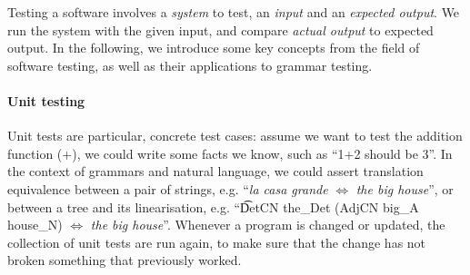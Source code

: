 


Testing a software involves a \emph{system} to test, an \emph{input}
and an \emph{expected output}. We run the system with the given
input, and compare \emph{actual output} to expected output.
In the following, we introduce some key concepts from the field of
software testing, as well as their applications to grammar testing.

\paragraph{Unit testing}

Unit tests are particular, concrete test cases: assume we want to test the
addition function (+), we could write some facts we know, such as
``1+2 should be 3''. In the context of grammars and natural language,
we could assert translation equivalence between a pair of strings,
e.g. ``\emph{la casa grande} $\Leftrightarrow$ \emph{the big house}'',
or between a tree and its linearisation, e.g. ``\t{DetCN the\_Det
  (AdjCN  big\_A house\_N)} $\Leftrightarrow$ \emph{the big house}''.
Whenever a program is changed or updated, the collection of unit tests
are run again, to make sure that the change has not broken something
that previously worked.

